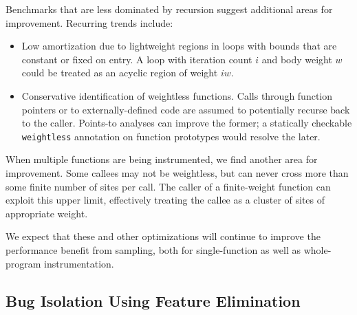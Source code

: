 Benchmarks that are less dominated by recursion suggest additional
areas for improvement.  Recurring trends include:

\begin{itemize}
\item Low amortization due to lightweight regions in loops with bounds
  that are constant or fixed on entry.  A loop with iteration count
  $i$ and body weight $w$ could be treated as an acyclic region of
  weight $iw$.

\item Conservative identification of weightless functions.  Calls
  through function pointers or to externally-defined code are assumed
  to potentially recurse back to the caller.  Points-to analyses can
  improve the former; a statically checkable \texttt{weightless}
  annotation on function prototypes would resolve the later.
\end{itemize}

When multiple functions are being instrumented, we find another area
for improvement.  Some callees may not be weightless, but can never
cross more than some finite number of sites per call.  The caller of a
finite-weight function can exploit this upper limit, effectively
treating the callee as a cluster of sites of appropriate weight.

We expect that these and other optimizations will continue to improve
the performance benefit from sampling, both for single-function as
well as whole-program instrumentation.

\subsection{Bug Isolation Using Feature Elimination}
\label{subsec:ccrypt}





